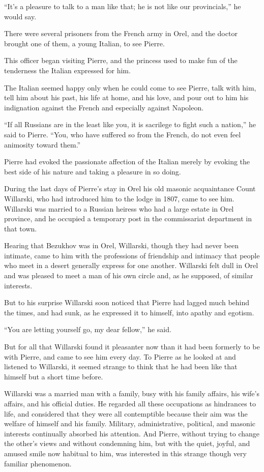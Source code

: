 ``It's a pleasure to talk to a man like that; he is not like our
provincials,'' he would say.

There were several prisoners from the French army in Orel, and
the doctor brought one of them, a young Italian, to see Pierre.

This officer began visiting Pierre, and the princess used to make
fun of the tenderness the Italian expressed for him.

The Italian seemed happy only when he could come to see Pierre,
talk with him, tell him about his past, his life at home, and his
love, and pour out to him his indignation against the French and
especially against Napoleon.

``If all Russians are in the least like you, it is sacrilege to
fight such a nation,'' he said to Pierre. ``You, who have
suffered so from the French, do not even feel animosity toward
them.''

Pierre had evoked the passionate affection of the Italian merely
by evoking the best side of his nature and taking a pleasure in
so doing.

During the last days of Pierre's stay in Orel his old masonic
acquaintance Count Willarski, who had introduced him to the lodge
in 1807, came to see him. Willarski was married to a Russian
heiress who had a large estate in Orel province, and he occupied
a temporary post in the commissariat department in that town.

Hearing that Bezukhov was in Orel, Willarski, though they had
never been intimate, came to him with the professions of
friendship and intimacy that people who meet in a desert
generally express for one another.  Willarski felt dull in Orel
and was pleased to meet a man of his own circle and, as he
supposed, of similar interests.

But to his surprise Willarski soon noticed that Pierre had lagged
much behind the times, and had sunk, as he expressed it to
himself, into apathy and egotism.

``You are letting yourself go, my dear fellow,'' he said.

But for all that Willarski found it pleasanter now than it had
been formerly to be with Pierre, and came to see him every
day. To Pierre as he looked at and listened to Willarski, it
seemed strange to think that he had been like that himself but a
short time before.

Willarski was a married man with a family, busy with his family
affairs, his wife's affairs, and his official duties. He regarded
all these occupations as hindrances to life, and considered that
they were all contemptible because their aim was the welfare of
himself and his family. Military, administrative, political, and
masonic interests continually absorbed his attention. And Pierre,
without trying to change the other's views and without condemning
him, but with the quiet, joyful, and amused smile now habitual to
him, was interested in this strange though very familiar
phenomenon.

